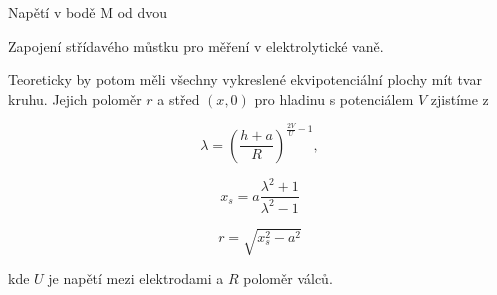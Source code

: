 \documentclass[a4paper,11pt]{article}
\begin{document}
\begin{table}[htpb]
    \begin{minipage}[b]{.45\linewidth}
        \centering
        \caption{Napětí v bodě M od dvou }
    \end{minipage} 
    \hfill
    \begin{minipage}[b]{.6\linewidth}
        \centering
        \caption{Zapojení střídavého můstku pro měření v elektrolytické vaně.}
    \end{minipage} 
\end{table}


Teoreticky by potom měli všechny vykreslené ekvipotenciální plochy mít tvar kruhu. Jejich poloměr \( r \)  a střed \( (x, 0) \) pro hladinu s potenciálem \( V \) zjistíme z


\begin{equation}
\lambda = (\frac{h + a}{R}) ^{\frac{2V}{U} - 1},
\end{equation}

\begin{equation}
 x_s = a \frac{\lambda ^2 + 1}{\lambda^2 - 1}
\end{equation}

\begin{equation}
r = \sqrt{ x_s^2 - a ^2} 
\end{equation}

\noindent
kde \( U \) je  napětí mezi elektrodami a \( R \) poloměr válců.

\begin{figure}[htpb]
    \centering
    
    
\end{figure}
\end{document}

